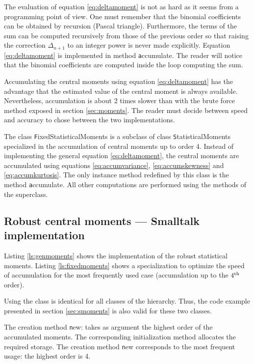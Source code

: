 The evaluation of equation \ref{eq:deltamoment} is not as hard as
it seems from a programming point of view. One must remember that
the binomial coefficients can be obtained by recursion (Pascal
triangle). Furthermore, the terms of the sum can be computed
recursively from those of the previous order so that raising the
correction $\Delta_{n+1}$ to an integer power is never made
explicitly. Equation \ref{eq:deltamoment} is implemented in method
{\texttt accumulate}. The reader will notice that the binomial
coefficients are computed inside the loop computing the sum.

Accumulating the central moments using equation
\ref{eq:deltamoment} has the advantage that the estimated value of
the central moment is always available. Nevertheless, accumulation
is about 2 times slower than with the brute force method exposed
in section \ref{sec:moments}. The reader must decide between speed
and accuracy to chose between the two implementations.

The class {\texttt FixedStatisticalMoments} is a subclass of class
{\texttt StatisticalMoments} specialized in the accumulation of
central moments up to order 4. Instead of implementing the general
equation \ref{eq:deltamoment}, the central moments are accumulated
using equations \ref{eq:accumvariance}, \ref{eq:accumskewness} and
\ref{eq:accumkurtosis}. The only instance method redefined by this
class is the method {\texttt accumulate}. All other computations are
performed using the methods of the superclass.

\subsection{Robust central moments --- Smalltalk implementation}
\label{sec:srobustmoment} Listing
\ref{ls:genmoments} shows the implementation of the robust
statistical moments. Listing \ref{ls:fixedmoments} shows a
specialization to optimize the speed of accumulation for the most
frequently used case (accumulation up to the $4^{\mathop{\textrm{th}}}$ order).

Using the class is identical for all classes of the hierarchy.
Thus, the code example presented in section \ref{sec:smoments} is
also valid for these two classes.

The creation method {\texttt new:} takes as argument the highest order
of the accumulated moments. The corresponding initialization
method allocates the required storage. The creation method {\texttt
new} corresponds to the most frequent usage: the highest order is
4.

